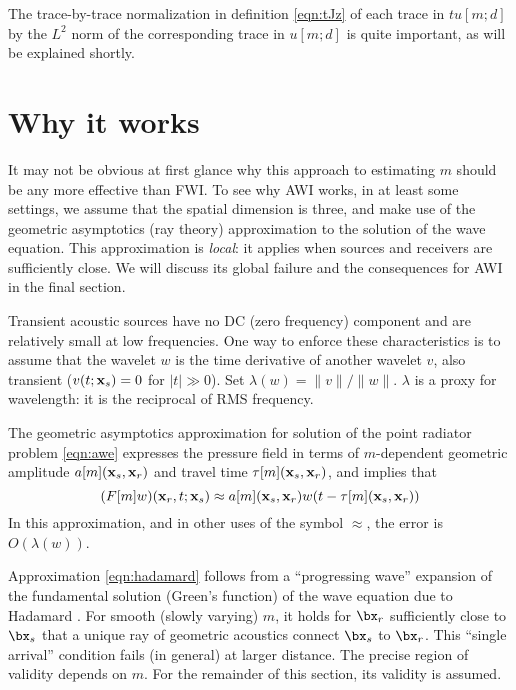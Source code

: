 The trace-by-trace normalization in definition \ref{eqn:tJz} of each
trace in $tu[m;d]$ by the
$L^2$ norm of the corresponding trace in $u[m;d]$ is quite important, as will be explained shortly.

\section{Why it works}

It may not be obvious at first glance why this approach to estimating
$m$ should be any more effective than FWI. To see why AWI works, in at
least some settings, we assume that the spatial dimension is three,
and make use of the geometric asymptotics (ray theory) approximation
to the solution of the wave equation. This approximation is {\em
  local}: it applies when sources and receivers are sufficiently
close. We will discuss its global failure and the consequences for AWI
in the final section.

Transient acoustic sources have no DC (zero frequency) component and
are relatively small at low frequencies. One way to enforce these
characteristics is to assume that the wavelet $w$ is the time
derivative of another wavelet $v$, also transient ($v(t;{\bf x}_s)=0$
for $|t| \gg 0$). Set $\lambda(w) = \|v\|/\|w\|$. $\lambda$ is a proxy for wavelength: it is the reciprocal of RMS frequency.

The geometric asymptotics approximation for solution of the point
radiator problem \ref{eqn:awe} expresses the pressure field in terms
of $m$-dependent geometric amplitude $a[m]({\bf x}_s,{\bf x}_r)$ and
travel time $\tau[m]({\bf x}_s,{\bf x}_r)$, and implies that
\begin{equation}
  \label{eqn:hadamard}
  (F[m]w)({\bf x}_r,t;{\bf x}_s) \approx a[m]({\bf x}_s,{\bf x}_r) w(t-\tau[m]({\bf x}_s,{\bf x}_r)) 
\end{equation}
In this approximation, and in other uses of the symbol $\approx$, the
error is $O(\lambda(w))$.

Approximation \ref{eqn:hadamard} follows from a
``progressing wave''  expansion of the fundamental
solution (Green's function) of the wave equation due to Hadamard
\cite[]{Friedlander:75,Qian:JCP24}. For smooth (slowly varying)
$m$, it holds for $\bx_r$ sufficiently close to $\bx_s$ that a unique ray of
geometric acoustics connect $\bx_s$ to $\bx_r$. This ``single
arrival'' condition fails (in
general) at larger distance. The precise region of validity depends on
$m$. For the remainder of this section, its validity is assumed.

